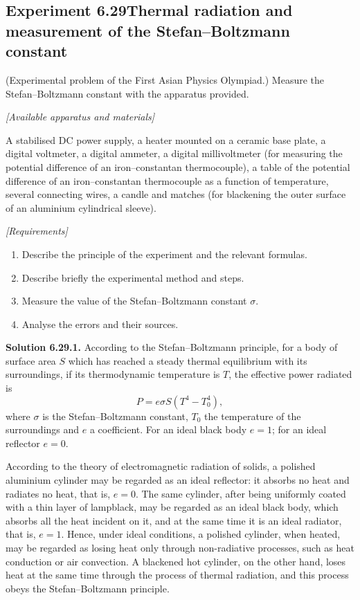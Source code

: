 \subsection*{Experiment 6.29\quad Thermal radiation and measurement of the Stefan--Boltzmann constant}

(Experimental problem of the First Asian Physics Olympiad.) Measure the Stefan--Boltzmann constant with the apparatus provided.

\noindent\textit{[Available apparatus and materials]}

A stabilised DC power supply, a heater mounted on a ceramic base plate, a digital voltmeter, a digital ammeter, a digital millivoltmeter (for measuring the potential difference of an iron--constantan thermocouple), a table of the potential difference of an iron--constantan thermocouple as a function of temperature, several connecting wires, a candle and matches (for blackening the outer surface of an aluminium cylindrical sleeve).

\noindent\textit{[Requirements]}
\begin{enumerate}[label=(\arabic*),leftmargin=2.2em,itemsep=1pt,topsep=2pt]
\item Describe the principle of the experiment and the relevant formulas.
\item Describe briefly the experimental method and steps.
\item Measure the value of the Stefan--Boltzmann constant $\sigma$.
\item Analyse the errors and their sources.
\end{enumerate}

\medskip
\noindent\textbf{Solution 6.29.}\quad \textbf{1.} According to the Stefan--Boltzmann principle, for a body of surface area $S$ which has reached a steady thermal equilibrium with its surroundings, if its thermodynamic temperature is $T$, the effective power radiated is
\begin{equation}\tag{1}
P=e\sigma S(T^{4}-T_0^{4}),
\end{equation}
where $\sigma$ is the Stefan--Boltzmann constant, $T_0$ the temperature of the surroundings and $e$ a coefficient. For an ideal black body $e=1$; for an ideal reflector $e=0$.

According to the theory of electromagnetic radiation of solids, a polished aluminium cylinder may be regarded as an ideal reflector: it absorbs no heat and radiates no heat, that is, $e=0$. The same cylinder, after being uniformly coated with a thin layer of lampblack, may be regarded as an ideal black body, which absorbs all the heat incident
on it, and at the same time it is an ideal radiator, that is, $e=1$. Hence, under ideal conditions, a polished cylinder, when heated, may be regarded as losing heat only through non-radiative processes, such as heat conduction or air convection. A blackened hot cylinder, on the other hand, loses heat at the same time through the process of thermal radiation, and this process obeys the Stefan--Boltzmann principle.

